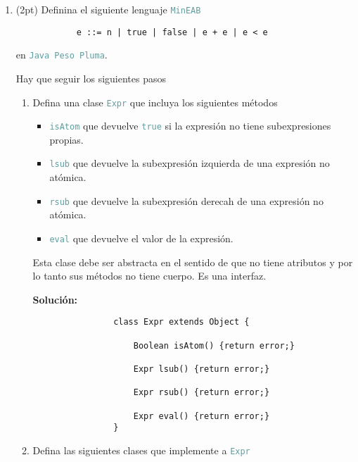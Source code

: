 \documentclass{article}
\newcommand{\tx}[1]{\textcolor{CadetBlue} {\texttt{#1}}}
\newcommand{\tb}[1]{\textcolor{RoyalPurple} {\textbf{#1}}}
\newcommand{\pt}[1]{\textcolor{RoyalPurple}{(#1pt)}}
\begin{document}
\begin{enumerate}
        \item \pt{2} Definina el siguiente lenguaje \tx{MinEAB}

        \begin{verbatim}
            e ::= n | true | false | e + e | e < e
        \end{verbatim}

        en \tx{Java Peso Pluma}.

        Hay que seguir los siguientes pasos

        \begin{enumerate}
            \item Defina una clase \tx{Expr} que incluya los siguientes métodos

            \begin{itemize}
                \item \tx{isAtom} que devuelve \tx{true} si la expresión no
                tiene subexpresiones propias.

                \item \tx{lsub} que devuelve la subexpresión izquierda de una
                expresión no atómica.

                \item \tx{rsub} que devuelve la subexpresión derecah de una
                expresión no atómica.

                \item \tx{eval} que devuelve el valor de la expresión.
            \end{itemize}

            Esta clase debe ser abstracta en el sentido de que no tiene 
            atributos y por lo tanto sus métodos no tiene cuerpo. Es una 
            interfaz.

            \tb{Solución:}

            \begin{verbatim}
                class Expr extends Object {

                    Boolean isAtom() {return error;}

                    Expr lsub() {return error;}

                    Expr rsub() {return error;}

                    Expr eval() {return error;}
                }
            \end{verbatim}

            \item Defina las siguientes clases que implemente a \tx{Expr}
            

\end{enumerate}
\end{enumerate}
\end{document}
